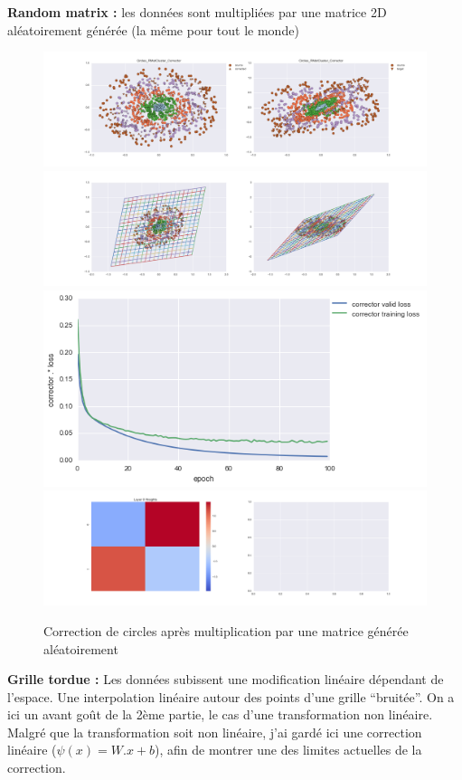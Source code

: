 {\Large \textbf{Random matrix :}} les données sont multipliées par une matrice 2D aléatoirement générée
 (la même pour tout le monde)

\begin{figure}[H] %
\centering
\includegraphics[width=\linewidth]{fig/24-05-2016/circles/Circles_RMatCluster_Corrector-DATA.png}
\includegraphics[width=\linewidth]{fig/24-05-2016/circles/Circles_RMatCluster_Corrector-GridCheck.png}
\includegraphics[width=0.45\linewidth]{fig/24-05-2016/circles/Circles_RMatCluster_Corrector-Learning_curve.png}
\includegraphics[width=\linewidth]{fig/24-05-2016/circles/Circles_RMatCluster_Corrector-W.png}
\caption{Correction de circles après multiplication par une matrice générée aléatoirement}
\label{fig:recap-circles-RMat-cluster}
\end{figure}

{\Large \textbf{Grille tordue :}} Les données subissent une modification linéaire dépendant de l'espace.
Une interpolation linéaire autour des points d'une grille ``bruitée''.
On a ici un avant goût de la 2ème partie, le cas d'une transformation non linéaire.
Malgré que la transformation soit non linéaire, j'ai gardé ici une correction linéaire ($\psi(x) = W.x+b$),
afin de montrer une des limites actuelles de la correction.

